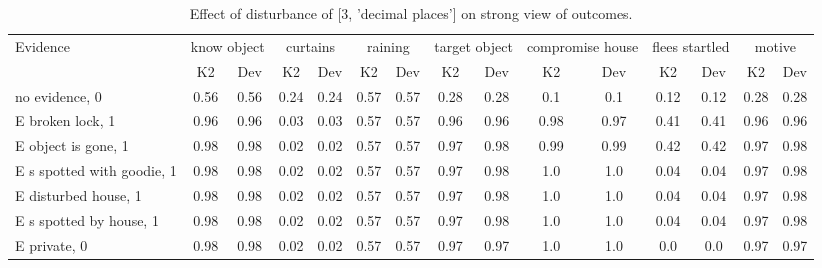 \begin{table}\begin{tabular}{l|cc|cc|cc|cc|cc|cc|cc}\toprule\multirow{2}{*}{Evidence} & \multicolumn{2}{c}{know object}& \multicolumn{2}{c}{curtains}& \multicolumn{2}{c}{raining}& \multicolumn{2}{c}{target object}& \multicolumn{2}{c}{compromise house}& \multicolumn{2}{c}{flees startled}& \multicolumn{2}{c}{motive}\\& {K2} & {Dev}& {K2} & {Dev}& {K2} & {Dev}& {K2} & {Dev}& {K2} & {Dev}& {K2} & {Dev}& {K2} & {Dev}\\\midrule
no evidence, 0 & 0.56&0.56&0.24&0.24&0.57&0.57&0.28&0.28&0.1&0.1&0.12&0.12&0.28&0.28\\E broken lock, 1 & 0.96&0.96&0.03&0.03&0.57&0.57&0.96&0.96&0.98&0.97&0.41&0.41&0.96&0.96\\E object is gone, 1 & 0.98&0.98&0.02&0.02&0.57&0.57&0.97&0.98&0.99&0.99&0.42&0.42&0.97&0.98\\E s spotted with goodie, 1 & 0.98&0.98&0.02&0.02&0.57&0.57&0.97&0.98&1.0&1.0&0.04&0.04&0.97&0.98\\E disturbed house, 1 & 0.98&0.98&0.02&0.02&0.57&0.57&0.97&0.98&1.0&1.0&0.04&0.04&0.97&0.98\\E s spotted by house, 1 & 0.98&0.98&0.02&0.02&0.57&0.57&0.97&0.98&1.0&1.0&0.04&0.04&0.97&0.98\\E private, 0 & 0.98&0.98&0.02&0.02&0.57&0.57&0.97&0.97&1.0&1.0&0.0&0.0&0.97&0.97\\\bottomrule\end{tabular}\caption{Effect of disturbance of [3, 'decimal places'] on strong view of outcomes.}\end{table}